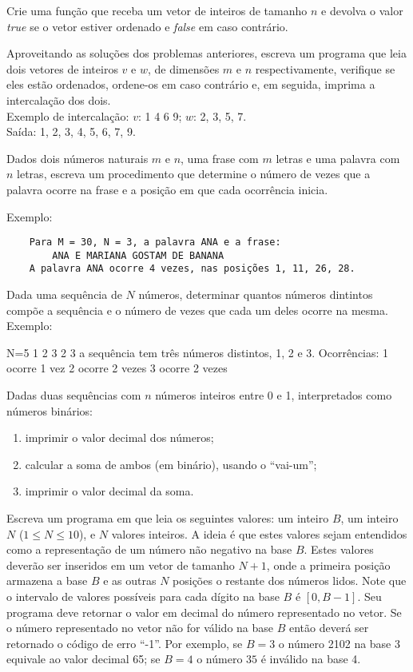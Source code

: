 \item Crie uma função que receba um vetor de inteiros de 
     tamanho $n$ e devolva o valor \emph{true} se o vetor estiver ordenado e 
     \emph{false} em caso contrário.

\item Aproveitando as soluções dos problemas anteriores, escreva um programa
     que leia dois vetores de inteiros $v$ e $w$, 
     de dimensões $m$ e $n$ 
     respectivamente, verifique se eles estão ordenados, ordene-os em caso 
     contrário e, em seguida, imprima a intercalação dos dois. \\
     Exemplo de intercalação: $v$: 1 4 6 9; $w$: 2, 3, 5, 7. \\
     Saída: 1, 2, 3, 4, 5, 6, 7, 9. 

\item Dados dois números naturais $m$ e $n$, uma frase com $m$ letras
e uma palavra com $n$ letras, escreva um procedimento que determine o número de
vezes que a palavra ocorre na frase e a posição em que cada ocorrência inicia.

    Exemplo:
    \begin{verbatim}
    Para M = 30, N = 3, a palavra ANA e a frase:
        ANA E MARIANA GOSTAM DE BANANA
    A palavra ANA ocorre 4 vezes, nas posições 1, 11, 26, 28.
    \end{verbatim}

\item Dada uma sequência de $N$ números, determinar quantos números dintintos
compõe  a sequência e  o número  de vezes  que cada  um deles  ocorre na
mesma. Exemplo:

N=5
1 2 3 2 3 
a sequência tem três números distintos, 1, 2 e 3. Ocorrências:
1 ocorre 1 vez
2 ocorre 2 vezes
3 ocorre 2 vezes

\item Dadas  duas  sequências  com  $n$  números  inteiros  entre  0  e  1,
interpretados como números binários:
\begin{enumerate}
     \item imprimir o valor decimal dos números;
     \item calcular a soma de ambos (em binário), usando o ``vai-um'';
     \item imprimir o valor decimal da soma.
\end{enumerate}


\item Escreva um programa em  que leia os seguintes valores:
um inteiro $B$, um inteiro $N$ ($1 \leq N \leq 10$), e $N$ valores inteiros.
A ideia é que estes valores sejam entendidos como a representação
de um número não negativo na base $B$. 
Estes valores deverão ser inseridos em um vetor de tamanho $N+1$, onde
a primeira posição armazena a base $B$ e as outras $N$ posições
o restante dos números lidos. 
%
Note que o  intervalo de valores possíveis para cada dígito na
base $B$ é $[0, B-1]$.
%
Seu programa deve retornar o valor em decimal do número representado
no vetor. Se o número representado no vetor não for válido na
base $B$ então deverá ser retornado o código de erro ``-1''.
Por exemplo, se $B=3$ o número 2102 na base 3 equivale ao valor decimal 65;
se $B=4$ o número $35$ é inválido na base 4.


